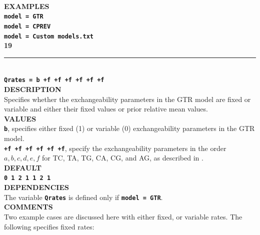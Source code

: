 \documentclass{book}
\numberwithin{equation}{section} \renewcommand{\baselinestretch}{0.55}
\begin{document}
\vspace{5pt}\\
\textbf{EXAMPLES} \vspace{5pt}\\
\textbf{\texttt{model = GTR}} \vspace{5pt}\\
\textbf{\texttt{model = CPREV}}\vspace{5pt}\\
\textbf{\texttt{model = Custom models.txt}}\vspace{10pt}\\
\textbf{{\large 19}} \\
\noindent\rule{\textwidth}{0.8pt} \\
\textbf{{\Large \texttt{Qrates = b +f +f +f +f +f +f}}} \vspace{5pt}\\
\textbf{DESCRIPTION} \vspace{5pt}\\
Specifies whether the exchangeability parameters in the GTR model are
fixed or variable and
either their fixed values or prior relative mean values. \vspace{5pt}\\
\textbf{VALUES} \vspace{5pt}\\
\textbf{\texttt{b}}, specifies either fixed (1) or variable (0) exchangeability parameters in the GTR model. \vspace{5pt}\\
\textbf{\texttt{+f +f +f +f +f +f}}, specify the exchangeability
parameters in the order $a, b, c, d, e, f$ for TC, TA, TG, CA, CG, and
AG, as described in \citealt{Yang1994a}.
\vspace{5pt}\\
\textbf{DEFAULT} \vspace{5pt}\\
\textbf{\texttt{0 1 2 1 1 2 1}} \vspace{5pt}\\
\textbf{DEPENDENCIES} \vspace{5pt}\\
The variable \textbf{\texttt{Qrates}} is defined only if
\textbf{\texttt{model = GTR}}.
\vspace{5pt}\\
\textbf{COMMENTS} \vspace{5pt}\\
Two example cases are discussed here with either fixed, or variable
rates.  The following specifies fixed rates:
\end{document}
